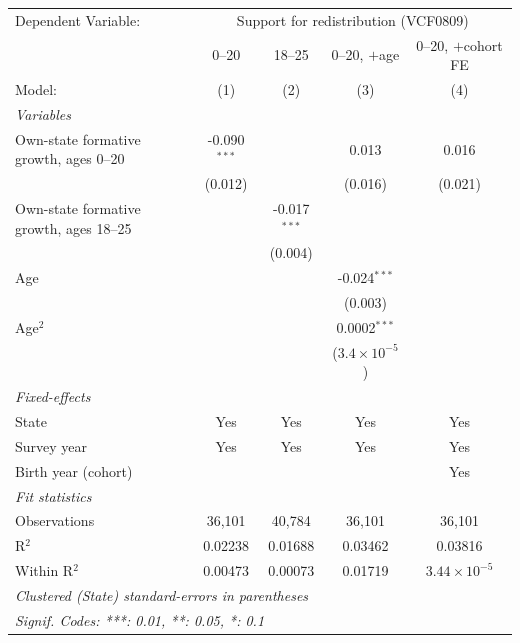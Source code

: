    \begin{tabular}{lcccc}
      \tabularnewline \midrule \midrule
      Dependent Variable: & \multicolumn{4}{c}{Support for redistribution (VCF0809)}\\
                                              & 0--20          & 18--25         & 0--20, $+$age          & 0--20, $+$cohort FE \\   
      Model:                                  & (1)            & (2)            & (3)                    & (4)\\  
      \midrule
      \emph{Variables}\\
      Own-state formative growth, ages 0--20  & -0.090$^{***}$ &                & 0.013                  & 0.016\\   
                                              & (0.012)        &                & (0.016)                & (0.021)\\   
      Own-state formative growth, ages 18--25 &                & -0.017$^{***}$ &                        &   \\   
                                              &                & (0.004)        &                        &   \\   
      Age                                     &                &                & -0.024$^{***}$         &   \\   
                                              &                &                & (0.003)                &   \\   
      Age$^2$                                 &                &                & 0.0002$^{***}$         &   \\   
                                              &                &                & ($3.4\times 10^{-5}$)  &   \\   
      \midrule
      \emph{Fixed-effects}\\
      State                                   & Yes            & Yes            & Yes                    & Yes\\  
      Survey year                             & Yes            & Yes            & Yes                    & Yes\\  
      Birth year (cohort)                     &                &                &                        & Yes\\  
      \midrule
      \emph{Fit statistics}\\
      Observations                            & 36,101         & 40,784         & 36,101                 & 36,101\\  
      R$^2$                                   & 0.02238        & 0.01688        & 0.03462                & 0.03816\\  
      Within R$^2$                            & 0.00473        & 0.00073        & 0.01719                & $3.44\times 10^{-5}$\\   
      \midrule \midrule
      \multicolumn{5}{l}{\emph{Clustered (State) standard-errors in parentheses}}\\
      \multicolumn{5}{l}{\emph{Signif. Codes: ***: 0.01, **: 0.05, *: 0.1}}\\
   \end{tabular}
